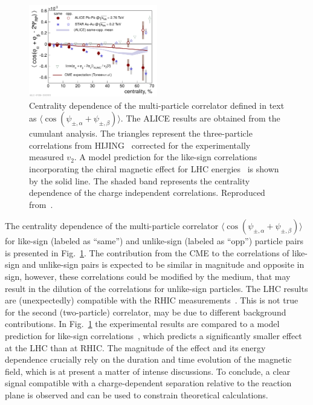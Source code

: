 \begin{figure}
\centering
\includegraphics[width=0.5\textwidth]{ksfigures/ChargeSepar.pdf}
\caption{Centrality dependence of the multi-particle correlator defined in text as $\langle \cos{(\psi_{\pm,\alpha} + \psi_{\pm,\beta})} \rangle$. The ALICE results are obtained from the cumulant analysis.  The triangles represent the three-particle correlations from HIJING~\cite{Wang:1991hta} corrected for the experimentally measured $v_2$. A model prediction for the like-sign correlations incorporating the chiral magnetic effect for LHC energies~\cite{Toneev:2010xt} is shown by the solid line. The shaded band represents the centrality dependence of the charge independent correlations. Reproduced from~\cite{Abelev:2012pa}.}
\label{figks:ChSep}
\end{figure}


The centrality dependence of the multi-particle correlator $\langle \cos{(\psi_{\pm,\alpha} + \psi_{\pm,\beta})} \rangle$ for like-sign (labeled as ``same'') and unlike-sign (labeled as ``opp'') particle pairs is presented in Fig.~\ref{figks:ChSep}. The contribution from the CME to the correlations of like-sign and unlike-sign pairs is expected to be similar in magnitude and opposite in sign, however, these correlations could be modified by the medium, that may result in the dilution of the correlations for unlike-sign particles. The LHC results are (unexpectedly) compatible with the RHIC measurements~\cite{Abelev:2009ac}. This is not true for the second (two-particle) correlator, may be due to different background contributions. In Fig.~\ref{figks:ChSep} the experimental results are compared to a model prediction for like-sign correlations~\cite{Toneev:2010xt}, which predicts a significantly smaller effect at the LHC than at RHIC. The magnitude of the effect and its energy dependence crucially rely on the duration and time evolution of the magnetic field, which is at present a matter of intense discussions. To conclude, a clear signal compatible with a charge-dependent separation relative to the reaction plane is observed and can be used to constrain theoretical calculations.
